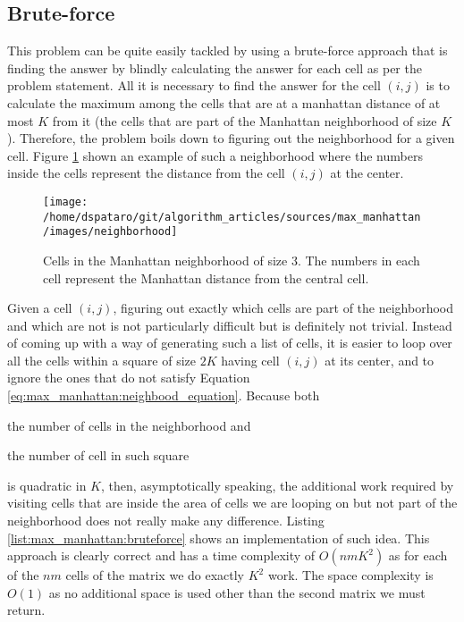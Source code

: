 \subsection{Brute-force}
\label{max_manhattan:sec:bruteforce}
This problem can be quite easily tackled by using a brute-force approach that is finding the answer by blindly calculating the answer for each cell as per the problem statement. 
All it is necessary to find the answer for the cell $(i,j)$ is to calculate the maximum among the cells that are at a manhattan distance of at most $K$ from it (the cells that are part of the Manhattan
neighborhood of size $K$). Therefore, the problem boils down to figuring out the neighborhood for a
given cell. Figure \ref{fig:max_manhattan:neighborhood} shown an example of such a neighborhood
where the numbers inside the cells represent the distance from the cell $(i,j)$ at the center. 
\begin{figure}
    \centering
    \texttt{[image: /home/dspataro/git/algorithm\_articles/sources/max\_manhattan/images/neighborhood]}
    \caption[Cells in the Manhattan neighborhood of size $3$.]{Cells in the Manhattan neighborhood
    of size $3$. The numbers in each cell represent the Manhattan distance from the central cell.}
    \label{fig:max_manhattan:neighborhood}
\end{figure}
Given a cell $(i,j)$, figuring out exactly which cells are part of the neighborhood and which are
not is not particularly difficult but is definitely not trivial. Instead of coming up with a way of
generating such a list of cells, it is easier to loop over all the cells within a square of size
$2K$ having cell $(i,j)$ at its center, and to ignore the ones that do not satisfy Equation
\ref{eq:max_manhattan:neighbood_equation}. Because both 
\begin{enumerate*}
    \item the number of cells in the neighborhood and 
    \item the number of cell in such square \end{enumerate*} is quadratic in $K$, then,
asymptotically speaking, the additional work required by visiting cells that are inside the area of
cells we are looping on but not part of the neighborhood does not really make any difference.
Listing \ref{list:max_manhattan:bruteforce} shows an implementation of such idea. This approach is
clearly correct and has a time complexity of $O(nmK^2)$ as for each of the $nm$ cells of the matrix
we do exactly $K^2$ work. The space complexity is $O(1)$ as no additional space is used other than
the second matrix we must return.



